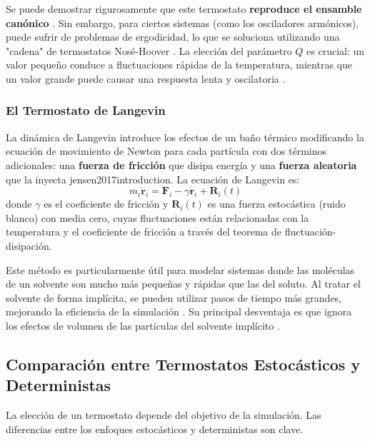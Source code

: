 Se puede demostrar rigurosamente que este termostato \textbf{reproduce el ensamble canónico} \cite[108]{zhou2022molecular}. Sin embargo, para ciertos sistemas (como los osciladores armónicos), puede sufrir de problemas de ergodicidad, lo que se soluciona utilizando una "cadena" de termostatos Nosé-Hoover \cite[694]{frenkel2002understanding}. La elección del parámetro $Q$ es crucial: un valor pequeño conduce a fluctuaciones rápidas de la temperatura, mientras que un valor grande puede causar una respuesta lenta y oscilatoria \cite[759, 278]{frenkel2002understanding}.

\subsubsection{El Termostato de Langevin}
La dinámica de Langevin introduce los efectos de un baño térmico modificando la ecuación de movimiento de Newton para cada partícula con dos términos adicionales: una \textbf{fuerza de fricción} que disipa energía y una \textbf{fuerza aleatoria} que la inyecta \cite[267, 476]{frenkel2002understanding}{jensen2017introduction}. La ecuación de Langevin es:
\begin{equation}
m_i \ddot{\mathbf{r}}_i = \mathbf{F}_i - \gamma \dot{\mathbf{r}}_i + \mathbf{R}_i(t)
\end{equation}
donde $\gamma$ es el coeficiente de fricción y $\mathbf{R}_i(t)$ es una fuerza estocástica (ruido blanco) con media cero, cuyas fluctuaciones están relacionadas con la temperatura y el coeficiente de fricción a través del teorema de fluctuación-disipación.

Este método es particularmente útil para modelar sistemas donde las moléculas de un solvente son mucho más pequeñas y rápidas que las del soluto. Al tratar el solvente de forma implícita, se pueden utilizar pasos de tiempo más grandes, mejorando la eficiencia de la simulación \cite[108]{zhou2022molecular}. Su principal desventaja es que ignora los efectos de volumen de las partículas del solvente implícito \cite[108]{zhou2022molecular}.

\subsection{Comparación entre Termostatos Estocásticos y Deterministas}

La elección de un termostato depende del objetivo de la simulación. Las diferencias entre los enfoques estocásticos y deterministas son clave.

